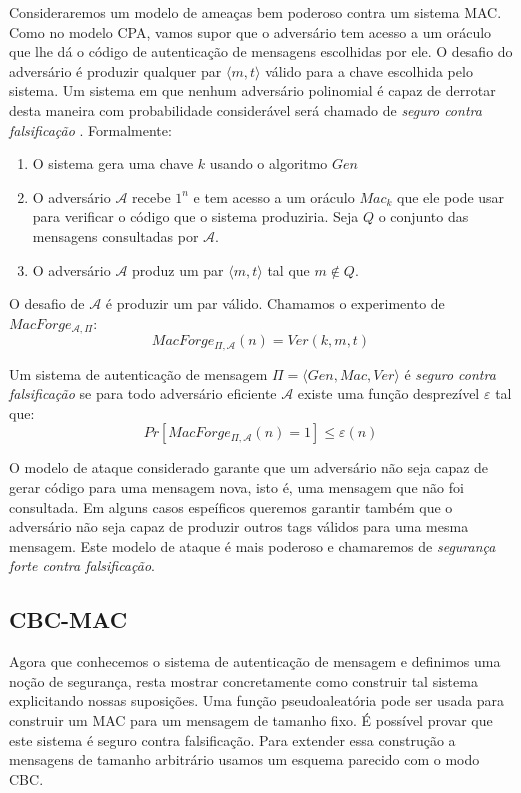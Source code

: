 Consideraremos um modelo de ameaças bem poderoso contra um sistema MAC.
Como no modelo CPA, vamos supor que o adversário tem acesso a um oráculo que lhe dá o código de autenticação de mensagens escolhidas por ele.
O desafio do adversário é produzir qualquer par $\langle m, t \rangle$ válido para a chave escolhida pelo sistema.
Um sistema em que nenhum adversário polinomial é capaz de derrotar desta maneira com probabilidade considerável será chamado de {\em seguro contra falsificação} \cite{Bellare00}.
Formalmente:
\begin{enumerate}
\item O sistema gera uma chave $k$ usando o algoritmo $Gen$
\item O adversário $\mathcal{A}$ recebe $1^n$ e tem acesso a um oráculo $Mac_k$ que ele pode usar para verificar o código que o sistema produziria. Seja $Q$ o conjunto das mensagens consultadas por $\mathcal{A}$.
\item O adversário $\mathcal{A}$ produz um par $\langle m, t \rangle$ tal que $m \notin Q$.
\end{enumerate}

O desafio de $\mathcal{A}$ é produzir um par válido.
Chamamos o experimento de $MacForge_{\mathcal{A}, \Pi}$:
\begin{displaymath}
  MacForge_{\Pi, \mathcal{A}}(n) = Ver(k, m, t)
\end{displaymath}

Um sistema de autenticação de mensagem $\Pi = \langle Gen, Mac, Ver \rangle$ é {\em seguro contra falsificação} se para todo adversário eficiente $\mathcal{A}$ existe uma função desprezível $\varepsilon$ tal que:
\begin{displaymath}
  Pr[MacForge_{\Pi, \mathcal{A}}(n) = 1] \leq \varepsilon(n)
\end{displaymath}

O modelo de ataque considerado garante que um adversário não seja capaz de gerar código para uma mensagem nova, isto é, uma mensagem que não foi consultada.
Em alguns casos espeíficos queremos garantir também que o adversário não seja capaz de produzir outros tags válidos para uma mesma mensagem.
Este modelo de ataque é mais poderoso e chamaremos de {\em segurança forte contra falsificação}.

\subsection{CBC-MAC}
\label{sec:cbc-mac}

Agora que conhecemos o sistema de autenticação de mensagem e definimos uma noção de segurança, resta mostrar concretamente como construir tal sistema explicitando nossas suposições.
Uma função pseudoaleatória pode ser usada para construir um MAC para um mensagem de tamanho fixo.
É possível provar que este sistema é seguro contra falsificação.
Para extender essa construção a mensagens de tamanho arbitrário usamos um esquema parecido com o modo CBC.

